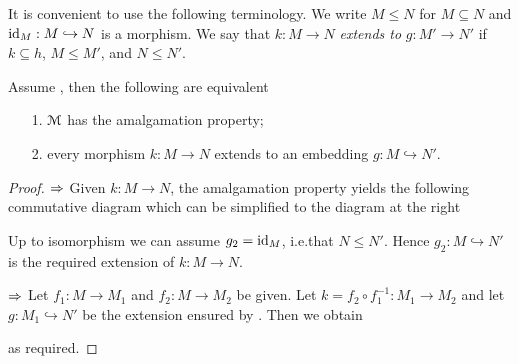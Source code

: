 \documentclass[creche.tex]{subfiles}
\begin{document}
\hfil{}

It is convenient to use the following terminology.
We write \emph{$M\le N$\/} for $M\subseteq N$ and $\textrm{id}_M:M\hookrightarrow N$ is a morphism.
We say that $k:M\to N$ \emph{extends to\/} $g:M'\to N'$ if $k\subseteq h$, $M\le M'$, and  $N\le N'$.


\begin{proposition}\label{prop_amalgamation_def}
Assume , then the following are equivalent
\begin{itemize}
\item[1.] $\EuScript M$ has the amalgamation property;
\item[2.] every morphism $k:M\to N$ extends to an embedding $g : M\hookrightarrow N'$.
\end{itemize}
\end{proposition}

\begin{proof}
$\Rightarrow$ Given $k:M\to N$, the amalgamation property yields the following commutative diagram which can be simplified to the diagram at the right

\hfil{}
\hfil{}

Up to isomorphism we can assume $g_2=\textrm{id}_M$, i.e.\@ that $N\le N'$.
Hence $g_2:M\hookrightarrow N'$ is the required extension of $k:M\to N$.

$\Rightarrow$ Let  $f_1:M\to M_1$ and $f_2:M\to M_2$ be given.
Let $k=f_2\circ f_1^{-1}:M_1\to M_2$ and let  $g:M_1\hookrightarrow N'$ be the extension ensured by .
Then we obtain

\hfil{}

as required.
\end{proof}
\end{document}
